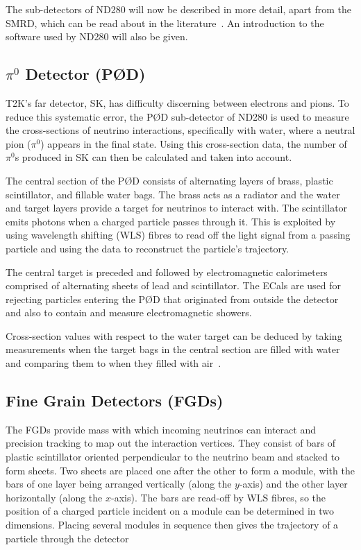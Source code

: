 \documentclass[aps,pra,12pt,notitlepage,tightenlines]{revtex4-1}
\begin{document}
The sub-detectors of ND280 will now be described in more detail, apart from the SMRD, which can be read about in the literature~\cite{Aoki2013}. An introduction to the software used by ND280 will also be given.

\subsection{$\pi^0$ Detector (P\O D)}
T2K's far detector, SK, has difficulty discerning between electrons and pions. To reduce this systematic error, the P\O D sub-detector of ND280 is used to measure the cross-sections of neutrino interactions, specifically with water, where a neutral pion ($\pi^0$) appears in the final state. Using this cross-section data, the number of $\pi^0$s produced in SK can then be calculated and taken into account.

The central section of the P\O D consists of alternating layers of brass, plastic scintillator, and fillable water bags. The brass acts as a radiator and the water and target layers provide a target for neutrinos to interact with. The scintillator emits photons when a charged particle passes through it. This is exploited by using wavelength shifting (WLS) fibres to read off the light signal from a passing particle and using the data to reconstruct the particle's trajectory. 

The central target is preceded and followed by electromagnetic calorimeters comprised of alternating sheets of lead and scintillator. The ECals are used for rejecting particles entering the P\O D that originated from outside the detector and also to contain and measure electromagnetic showers. 

Cross-section values with respect to the water target can be deduced by taking measurements when the target bags in the central section are filled with water and comparing them to when they filled with air~\cite{ABE2011106, Assylbekov:2011sh}.

\subsection{Fine Grain Detectors (FGDs)}
The FGDs provide mass with which incoming neutrinos can interact and precision tracking to map out the interaction vertices. They consist of bars of plastic scintillator oriented perpendicular to the neutrino beam and stacked to form sheets. Two sheets are placed one after the other to form a module, with the bars of one layer being arranged vertically (along the $y$-axis) and the other layer horizontally (along the $x$-axis). The bars are read-off by WLS fibres, so the position of a charged particle incident on a module can be determined in two dimensions. Placing several modules in sequence then gives the trajectory of a particle through the detector
\end{document}
